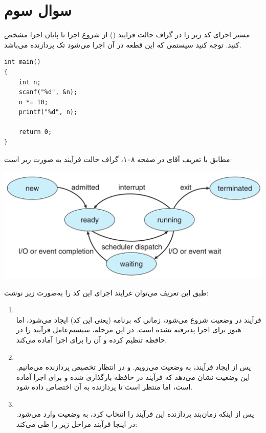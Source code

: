 \section{سوال سوم}

مسیر اجرای کد زیر را در گراف حالت فرایند () از شروع اجرا تا پایان اجرا مشخص کنید. توجه کنید سیستمی که این قطعه در آن اجرا می‌شود تک پردازنده می‌باشد.


\begin{latin}
\begin{lstlisting}[caption=Code of Q3, label=cpp_code_example]
int main()
{
	int n;
	scanf("%d", &n);
	n *= 10;
	printf("%d", n);
	
	return 0;
}
\end{lstlisting}
\end{latin}


\begin{qsolve}
	مطابق با تعریف آقای  در صفحه ۱۰۸، گراف حالت فرآیند به صورت زیر است:
	
	
	\begin{center}
		\includegraphics*[width=0.7\linewidth]{pics/img1.png}
	\end{center}
	
	طبق این تعریف می‌توان غرایند اجرای این کد را به‌صورت زیر نوشت:
	
	\begin{enumerate}
		\item 
		\textbf{}\\
		فرآیند در وضعیت  شروع می‌شود، زمانی که برنامه (یعنی این کد) ایجاد می‌شود، اما هنوز برای اجرا پذیرفته نشده است. در این مرحله، سیستم‌عامل فرآیند را در حافظه تنظیم کرده و آن را برای اجرا آماده می‌کند.
		
		
		
		
		\item 
		\textbf{}\\
		پس از ایجاد فرآیند، به وضعیت  می‌رویم. و در انتظار تخصیص پردازنده می‌مانیم. این وضعیت نشان می‌دهد که فرآیند در حافظه بارگذاری شده و برای اجرا آماده است، اما منتظر است تا پردازنده به آن اختصاص داده شود.
		
		
		
		
		\item 
		\textbf{}\\
		پس از اینکه زمان‌بند پردازنده این فرآیند را انتخاب کرد، به وضعیت  وارد می‌شود. در اینجا فرآیند مراحل زیر را طی می‌کند:		

	\end{enumerate}
\end{qsolve}



